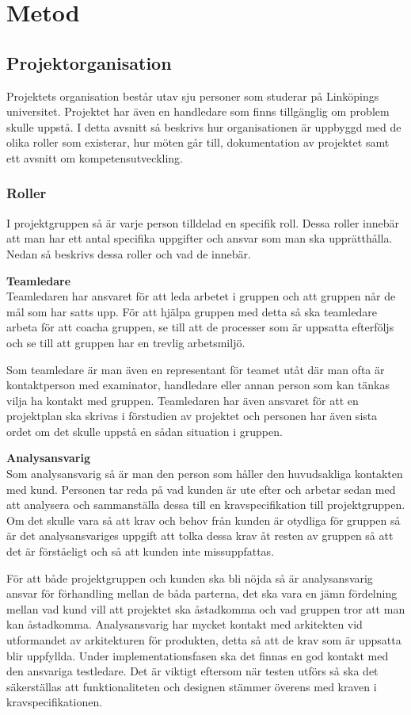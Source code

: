 \chapter{Metod}

\section{Projektorganisation}
Projektets organisation består utav sju personer som studerar på Linköpings universitet. Projektet har även en handledare som finns tillgänglig om problem skulle uppstå. I detta avsnitt så beskrivs hur organisationen är uppbyggd med de olika roller som existerar, hur möten går till, dokumentation av projektet samt ett avsnitt om kompetensutveckling.

\subsection{Roller}
I projektgruppen så är varje person tilldelad en specifik roll. Dessa roller innebär att man har ett antal specifika uppgifter och ansvar som man ska upprätthålla. Nedan så beskrivs dessa roller och vad de innebär.

\textbf{Teamledare}\\
Teamledaren har ansvaret för att leda arbetet i gruppen och att gruppen når de mål som har satts upp. För att hjälpa gruppen med detta så ska teamledare arbeta för att coacha gruppen, se till att de processer som är uppsatta efterföljs och se till att gruppen har en trevlig arbetsmiljö.

Som teamledare är man även en representant för teamet utåt där man ofta är kontaktperson med examinator, handledare eller annan person som kan tänkas vilja ha kontakt med gruppen. Teamledaren har även ansvaret för att en projektplan ska skrivas i förstudien av projektet och personen har även sista ordet om det skulle uppstå en sådan situation i gruppen.

\textbf{Analysansvarig}\\
Som analysansvarig så är man den person som håller den huvudsakliga kontakten med kund. Personen tar reda på vad kunden är ute efter och arbetar sedan med att analysera och sammanställa dessa till en kravspecifikation till projektgruppen. Om det skulle vara så att krav och behov från kunden är otydliga för gruppen så är det analysansvariges uppgift att tolka dessa krav åt resten av gruppen så att det är förståeligt och så att kunden inte missuppfattas.

För att både projektgruppen och kunden ska bli nöjda så är analysansvarig ansvar för förhandling mellan de båda parterna, det ska vara en jämn fördelning mellan vad kund vill att projektet ska åstadkomma och vad gruppen tror att man kan åstadkomma. Analysansvarig har mycket kontakt med arkitekten vid utformandet av arkitekturen för produkten, detta så att de krav som är uppsatta blir uppfyllda. Under implementationsfasen ska det finnas en god kontakt med den ansvariga testledare. Det är viktigt eftersom när testen utförs så ska det säkerställas att funktionaliteten och designen stämmer överens med kraven i kravspecifikationen.

